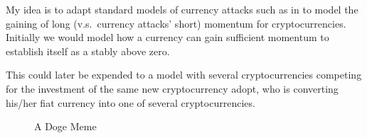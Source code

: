 \begin{refsection}
My idea is to adapt standard models of currency attacks such as in \textcite{obstfeld1986rational,obstfeld1995logic,obstfeld1996models} to model the gaining of long (v.s.~currency attacks' short) momentum for cryptocurrencies. Initially we would model how a currency can gain sufficient momentum to establish itself as a stably above zero.

This could later be expended to a model with several cryptocurrencies competing for the investment of the same new cryptocurrency adopt, who is converting his/her fiat currency into one of several cryptocurrencies.

\begin{figure}
\caption{A Doge Meme}
\label{doge}
\end{figure}

\printbibliography
\end{refsection}